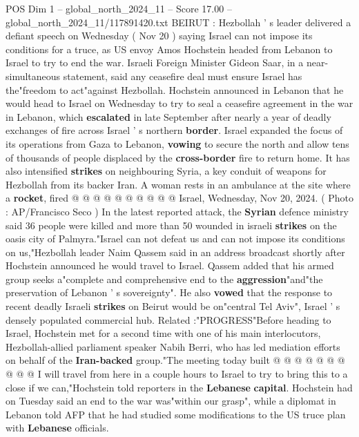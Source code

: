 \begin{textsample}{POS Dim 1 – global\_north\_2024\_11 – Score 17.00 – global\_north\_2024\_11/117891420.txt}  \label{ex:f1_pos_239}
BEIRUT : Hezbollah ' s leader delivered a defiant speech on Wednesday ( Nov 20 ) saying Israel can not impose its conditions for a truce, as US envoy Amos Hochstein headed from Lebanon to Israel to try to end the war.
Israeli Foreign Minister Gideon Saar, in a near-simultaneous statement, said any ceasefire deal must ensure Israel has the"freedom to act"against Hezbollah.
Hochstein announced in Lebanon that he would head to Israel on Wednesday to try to seal a ceasefire agreement in the war in Lebanon, which \textbf{escalated} in late September after nearly a year of deadly exchanges of fire across Israel ' s northern \textbf{border}.
Israel expanded the focus of its operations from Gaza to Lebanon, \textbf{vowing} to secure the north and allow tens of thousands of people displaced by the \textbf{cross-border} fire to return home.
It has also intensified \textbf{strikes} on neighbouring Syria, a key conduit of weapons for Hezbollah from its backer Iran.
A woman rests in an ambulance at the site where a \textbf{rocket}, fired @ @ @ @ @ @ @ @ @ @ Israel, Wednesday, Nov 20, 2024. ( Photo : AP/Francisco Seco ) In the latest reported attack, the \textbf{Syrian} defence ministry said 36 people were killed and more than 50 wounded in israeli \textbf{strikes} on the oasis city of Palmyra."Israel can not defeat us and can not impose its conditions on us,"Hezbollah leader Naim Qassem said in an address broadcast shortly after Hochstein announced he would travel to Israel.
Qassem added that his armed group seeks a"complete and comprehensive end to the \textbf{aggression}"and"the preservation of Lebanon ' s sovereignty".
He also \textbf{vowed} that the response to recent deadly Israeli \textbf{strikes} on Beirut would be on"central Tel Aviv", Israel ' s densely populated commercial hub.
Related :"PROGRESS"Before heading to Israel, Hochstein met for a second time with one of his main interlocutors, Hezbollah-allied parliament speaker Nabih Berri, who has led mediation efforts on behalf of the \textbf{Iran-backed} group."The meeting today built @ @ @ @ @ @ @ @ @ @ I will travel from here in a couple hours to Israel to try to bring this to a close if we can,"Hochstein told reporters in the \textbf{Lebanese} \textbf{capital}.
Hochstein had on Tuesday said an end to the war was"within our grasp", while a diplomat in Lebanon told AFP that he had studied some modifications to the US truce plan with \textbf{Lebanese} officials.

\end{textsample}
